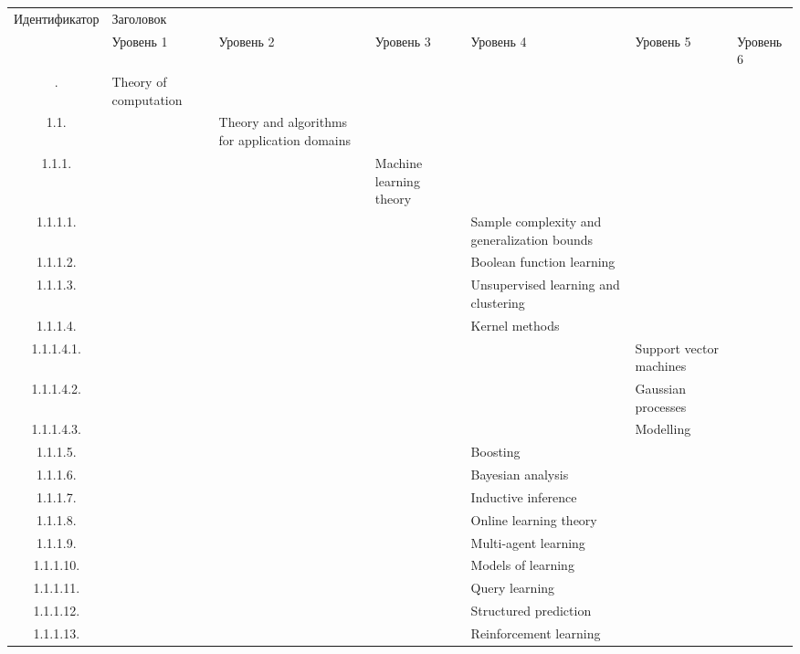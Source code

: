 \documentclass[12pt]{article}
\begin{document}
\begin{center}
	\def\arraystretch{0.9}	
	\linespread{0.8}
	
	{\tiny
	\begin{tabularx}{\linewidth}{|c|X|X|X|X|X|X|}		
		\toprule
		Идентификатор & \multicolumn{6}{l}{Заголовок} \\
		&                        Уровень 1 &                                             Уровень 2 &                                            Уровень 3 &                                                      Уровень 4 &                                              Уровень 5 &                                  Уровень 6 \\
		\midrule
		\endhead
		\midrule
		\endfoot
		\bottomrule
		\endlastfoot
		1. &  Theory of computation &   &   &   &   &   \\
		1.1. &   &  Theory and algorithms for application domains &   &   &   &   \\
		1.1.1. &   &   &  Machine learning theory &   &   &   \\
		1.1.1.1. &   &   &   &  Sample complexity and generalization bounds &   &   \\
		1.1.1.2. &   &   &   &  Boolean function learning &   &   \\
		1.1.1.3. &   &   &   &  Unsupervised learning and clustering &   &   \\
		1.1.1.4. &   &   &   &  Kernel methods &   &   \\
		1.1.1.4.1. &   &   &   &   &  Support vector machines &   \\
		1.1.1.4.2. &   &   &   &   &  Gaussian processes &   \\
		1.1.1.4.3. &   &   &   &   &  Modelling &   \\
		1.1.1.5. &   &   &   &  Boosting &   &   \\
		1.1.1.6. &   &   &   &  Bayesian analysis &   &   \\
		1.1.1.7. &   &   &   &  Inductive inference &   &   \\
		1.1.1.8. &   &   &   &  Online learning theory &   &   \\
		1.1.1.9. &   &   &   &  Multi-agent learning &   &   \\
		1.1.1.10. &   &   &   &  Models of learning &   &   \\
		1.1.1.11. &   &   &   &  Query learning &   &   \\
		1.1.1.12. &   &   &   &  Structured prediction &   &   \\
		1.1.1.13. &   &   &   &  Reinforcement learning &   &   \\

\end{tabularx}}
\end{center}
\end{document}
